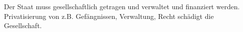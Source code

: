 Der Staat muss gesellschaftlich getragen und verwaltet und finanziert werden.
Privatisierung von z.B. Gefängnissen, Verwaltung, Recht schädigt die Gesellschaft.